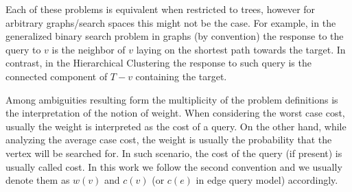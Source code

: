 Each of these problems is equivalent when restricted to trees, however for arbitrary graphs/search spaces this might not be the case. For example, in the generalized binary search problem in graphs (by convention) the response to the query to $v$ is the neighbor of $v$ laying on the shortest path towards the target. In contrast, in the Hierarchical Clustering the response to such query is the connected component of $T-v$ containing the target.
 
Among ambiguities resulting form the multiplicity of the problem definitions is the interpretation of the notion of weight. When considering the worst case cost, usually the weight is interpreted as the cost of a query. On the other hand, while analyzing the average case cost, the weight is usually the probability that the vertex will be searched for. In such scenario, the cost of the query (if present) is usually called cost. In this work we follow the second convention and we usually denote them as $w(v)$ and $c(v)$ (or $c(e)$ in edge query model) accordingly.
